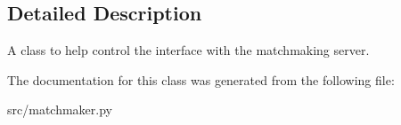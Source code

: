 \subsection{Detailed Description}
A class to help control the interface with the matchmaking server. 

The documentation for this class was generated from the following file:\begin{DoxyCompactItemize}
\item 
src/matchmaker.py\end{DoxyCompactItemize}
